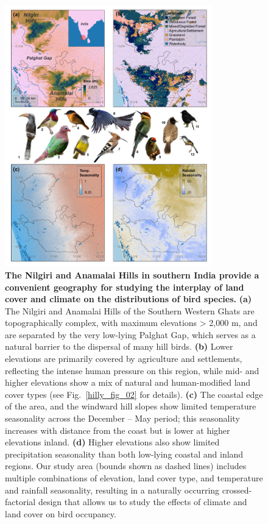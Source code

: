 \begin{figure}[h!]
    \centering
    \includegraphics[width=0.8\textwidth]{figures/hillybirds/fig_01.png}
    \caption{
        \textbf{The Nilgiri and Anamalai Hills in southern India provide a convenient geography for studying the interplay of land cover and climate on the distributions of bird species.}
        \textbf{(a)} The Nilgiri and Anamalai Hills of the Southern Western Ghats are topographically complex, with maximum elevations > 2,000 m, and are separated by the very low-lying Palghat Gap, which serves as a natural barrier to the dispersal of many hill birds. 
        \textbf{(b)} Lower elevations are primarily covered by agriculture and settlements, reflecting the intense human pressure on this region, while mid- and higher elevations show a mix of natural and human-modified land cover types (see Fig.~\ref{hilly_fig_02} for details). 
        \textbf{(c)} The coastal edge of the area, and the windward hill slopes show limited temperature seasonality across the December -- May period; this seasonality increases with distance from the coast but is lower at higher elevations inland. 
        \textbf{(d)} Higher elevations also show limited precipitation seasonality than both low-lying coastal and inland regions. 
        Our study area (bounds shown as dashed lines) includes multiple combinations of elevation, land cover type, and temperature and rainfall seasonality, resulting in a naturally occurring crossed-factorial design that allows us to study the effects of climate and land cover on bird occupancy. 
}
\end{figure}
